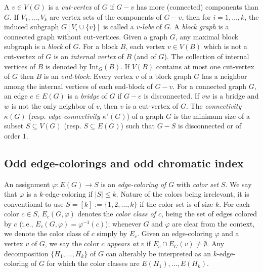 \documentclass[a4paper,12pt]{article}
\numberwithin{equation}{section}
\begin{document}
 A $v\in V(G)$ is a \textit{cut-vertex} of $G$ if $G-v$ has more (connected) components than $G$. If $V_1,\ldots,V_k$ are vertex sets of the components of $G-v$, then for $i=1,\ldots,k$, the induced subgraph $G[V_i\cup \{v\}]$ is called a \textit{$v$-lobe} of $G$.
 A \textit{block graph} is a connected graph without cut-vertices. Given a graph $G$, any maximal block subgraph is a \textit{block} of $G$. For a block $B$, each vertex $v\in V(B)$ which is not a cut-vertex of $G$ is an \textit{internal vertex} of $B$ (and of $G$). The collection of internal vertices of $B$ is denoted by $\mathrm{Int}_G(B)$.
 If $V(B)$ contains at most one cut-vertex of $G$ then $B$ is an \textit{end-block}. Every vertex $v$ of a block graph $G$ has a neighbor among the internal vertices of each end-block of $G-v$.
 For a connected graph $G$, an edge $e\in E(G)$ is a \textit{bridge} of $G$ if $G-e$ is disconnected. If $vw$ is a bridge and $w$ is not the only neighbor of $v$, then $v$ is a cut-vertex of $G$. The \textit{connectivity} $\kappa(G)$ (resp. \textit{edge-connectivity} $\kappa'(G)$) of a graph $G$ is the minimum size of a subset $S\subseteq V(G)$ (resp. $S\subseteq E(G)$) such that $G-S$ is disconnected or of order $1$.





\subsection{Odd edge-colorings and odd chromatic index}

An assignment $\varphi: E(G)\to S$ is an \textit{edge-coloring of $G$} with \textit{color set} $S$. We say that $\varphi$ is a $k$-edge-coloring if $|S|\leq k$. Nature of the colors being irrelevant, it is conventional  to use $S=[k]:=\{1,2,\ldots,k\}$ if the color set is of size $k$. For each color $c\in S$, $E_c(G,\varphi)$ denotes the \textit{color class of $c$}, being the set of edges colored by $c$ (i.e., $E_c(G,\varphi)=\varphi^{-1}(c)$); whenever $G$ and $\varphi$ are clear from the context, we denote the color class of $c$ simply by $E_c$.  Given an edge-coloring $\varphi$ and a vertex $v$ of $G$, we say the color $c$ \textit{appears at $v$} if $E_c\cap E_G(v)\neq \emptyset$. Any decomposition $\{H_1,\ldots, H_k\}$ of $G$ can alterably be interpreted as an $k$-edge-coloring of $G$ for which the color classes are $E(H_1),\ldots, E(H_k)$.
\end{document}
